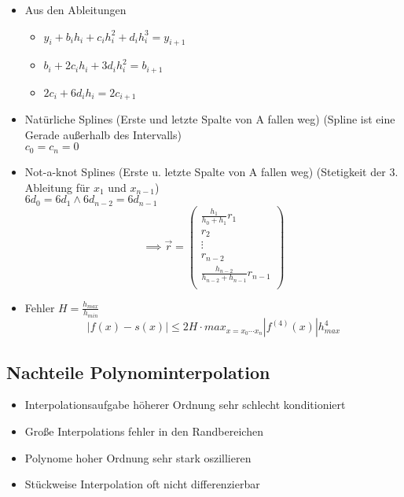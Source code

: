 \begin{itemize}
	\item Aus den Ableitungen
	\begin{itemize}
		\item $y_i + b_i h_i + c_i h_i^2 + d_i h_i^3 = y_{i+1}$
		\item $b_i + 2 c_i h_i + 3 d_i h_i^2 = b_{i+1}$
		\item $2 c_i + 6 d_i h_i = 2 c_{i+1}$
	\end{itemize}
	
	\item Natürliche Splines (Erste und letzte Spalte von A fallen weg)
	(Spline ist eine Gerade außerhalb des Intervalls) \\
	$c_0 = c_n = 0$
	
	\item Not-a-knot Splines (Erste u. letzte Spalte von A fallen weg)
	(Stetigkeit der 3. Ableitung für $x_1$ und $x_{n-1}$) \\
	$6d_0 = 6d_1 \wedge 6d_{n-2} = 6d_{n-1}$ 
	\begin{displaymath}
		\implies \vec{r} =
		\begin{pmatrix}
			\frac{h_1}{h_0 + h_1} r_1 \\
			r_2 \\
			\vdots \\
			r_{n-2} \\
			\frac{h_{n-2}}{h_{n-2}+h_{n-1}} r_{n-1} \\
		\end{pmatrix}
	\end{displaymath}
	
	\item Fehler $H = \frac{h_{max}}{h_{min}}$ \\
	\begin{equation*}
		|f(x)-s(x)| \leq 2H \cdot max_{x=x_0 \cdots x_n}|f^{(4)}(x)|h_{max}^4
	\end{equation*}
	
\end{itemize}

\subsection{Nachteile Polynominterpolation}
\begin{itemize}

	\item Interpolationsaufgabe höherer Ordnung sehr schlecht konditioniert

	\item Große Interpolations fehler in den Randbereichen
	
	\item Polynome hoher Ordnung sehr stark oszillieren
	
	\item Stückweise Interpolation oft nicht differenzierbar

\end{itemize}
